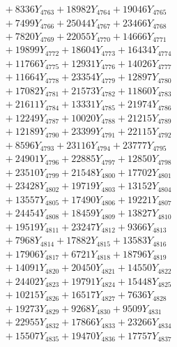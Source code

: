 \documentclass[a4paper,10pt]{article}
\begin{document}
{\begin{align}
&\;  + 8336 Y_{4763} + 18982 Y_{4764} + 19046 Y_{4765} \\[0.3ex]
&\;  + 7499 Y_{4766} + 25044 Y_{4767} + 23466 Y_{4768} \\[0.5ex]\allowbreak
&\;  + 7820 Y_{4769} + 22055 Y_{4770} + 14666 Y_{4771} \\[0.3ex]
&\;  + 19899 Y_{4772} + 18604 Y_{4773} + 16434 Y_{4774} \\[0.3ex]
&\;  + 11766 Y_{4775} + 12931 Y_{4776} + 14026 Y_{4777} \\[0.3ex]
&\;  + 11664 Y_{4778} + 23354 Y_{4779} + 12897 Y_{4780} \\[0.3ex]
&\;  + 17082 Y_{4781} + 21573 Y_{4782} + 11860 Y_{4783} \\[0.3ex]
&\;  + 21611 Y_{4784} + 13331 Y_{4785} + 21974 Y_{4786} \\[0.3ex]
&\;  + 12249 Y_{4787} + 10020 Y_{4788} + 21215 Y_{4789} \\[0.3ex]
&\;  + 12189 Y_{4790} + 23399 Y_{4791} + 22115 Y_{4792} \\[0.3ex]
&\;  + 8596 Y_{4793} + 23116 Y_{4794} + 23777 Y_{4795} \\[0.3ex]
&\;  + 24901 Y_{4796} + 22885 Y_{4797} + 12850 Y_{4798} \\[0.5ex]\allowbreak
&\;  + 23510 Y_{4799} + 21548 Y_{4800} + 17702 Y_{4801} \\[0.3ex]
&\;  + 23428 Y_{4802} + 19719 Y_{4803} + 13152 Y_{4804} \\[0.3ex]
&\;  + 13557 Y_{4805} + 17490 Y_{4806} + 19221 Y_{4807} \\[0.3ex]
&\;  + 24454 Y_{4808} + 18459 Y_{4809} + 13827 Y_{4810} \\[0.3ex]
&\;  + 19519 Y_{4811} + 23247 Y_{4812} + 9366 Y_{4813} \\[0.3ex]
&\;  + 7968 Y_{4814} + 17882 Y_{4815} + 13583 Y_{4816} \\[0.3ex]
&\;  + 17906 Y_{4817} + 6721 Y_{4818} + 18796 Y_{4819} \\[0.3ex]
&\;  + 14091 Y_{4820} + 20450 Y_{4821} + 14550 Y_{4822} \\[0.3ex]
&\;  + 24402 Y_{4823} + 19791 Y_{4824} + 15448 Y_{4825} \\[0.3ex]
&\;  + 10215 Y_{4826} + 16517 Y_{4827} + 7636 Y_{4828} \\[0.5ex]\allowbreak
&\;  + 19273 Y_{4829} + 9268 Y_{4830} + 9509 Y_{4831} \\[0.3ex]
&\;  + 22955 Y_{4832} + 17866 Y_{4833} + 23266 Y_{4834} \\[0.3ex]
&\;  + 15507 Y_{4835} + 19470 Y_{4836} + 17757 Y_{4837} \\[0.3ex]

\end{align}}
\end{document}
